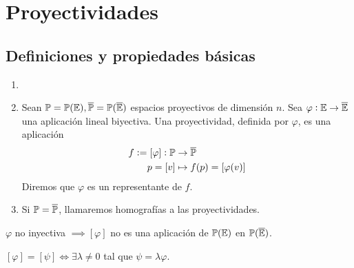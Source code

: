 \chapter{Proyectividades}
\section{Definiciones y propiedades básicas}

\begin{defi}
    \begin{enumerate}
        \item[]
        \item Sean $\mathbb{P} = \mathbb{P}(\mathbb{E}), \overline{\mathbb{P}} = \mathbb{P}(\overline{\mathbb{E}})$ espacios proyectivos de dimensión $n$. Sea $\varphi : \mathbb{E} \to \overline{\mathbb{E}}$ una aplicación lineal biyectiva. Una proyectividad, definida por $\varphi$, es una aplicación
        \begin{align*}
            f := [\varphi] : \mathbb{P} &\to \overline{\mathbb{P}} \\
            p = [v] &\mapsto f(p) = [\varphi(v)]
        \end{align*}
        Diremos que $\varphi$ es un representante de $f$.
        \item Si $\mathbb{P} = \overline{\mathbb{P}}$, llamaremos homografías a las proyectividades.
    \end{enumerate}
\end{defi}
\begin{obs}
    $\varphi$ no inyectiva $\implies [\varphi]$ no es una aplicación de $\mathbb{P}(\mathbb{E})$ en $\mathbb{P}(\overline{\mathbb{E}})$.
\end{obs}
\begin{obs}
    $[\varphi] = [\psi] \iff \exists \lambda \neq 0$ tal que $\psi = \lambda \varphi$.
\end{obs}
